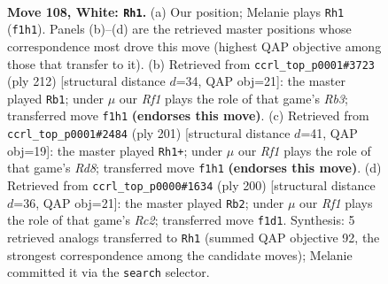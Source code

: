\documentclass[11pt]{article}
\begin{document}
\clearpage

\begin{figure}[p]\centering
\begin{subfigure}{0.46\textwidth}\centering
\resizebox{\linewidth}{!}{%
\newchessgame
\chessboard[
  setfen={8/2k5/p5r1/P1p2p1p/1p3P1P/1P2PKP1/8/5R2 w - - 3 108},
  showmover=false,
  pgfstyle=straightmove, color=movearrow, markmove={f1-h1}
]}
\caption{}
\end{subfigure}\hfill
\begin{subfigure}{0.46\textwidth}\centering
\resizebox{\linewidth}{!}{%
\newchessgame
\chessboard[
  setfen={8/5p2/4p2k/4Pp1p/5P1P/1R4PK/4r3/8 w - - 97 107},
  showmover=false,
  pgfstyle=straightmove, color=movearrow, markmove={b3-b1}
]}
\caption{}
\end{subfigure}
\\[4pt]
\begin{subfigure}{0.46\textwidth}\centering
\resizebox{\linewidth}{!}{%
\newchessgame
\chessboard[
  setfen={8/1R3pk1/4p1p1/6Pp/4P2P/5P1K/8/3r4 b - - 90 101},
  showmover=false,
  pgfstyle=straightmove, color=movearrow, markmove={d1-h1}
]}
\caption{}
\end{subfigure}\hfill
\begin{subfigure}{0.46\textwidth}\centering
\resizebox{\linewidth}{!}{%
\newchessgame
\chessboard[
  setfen={8/2p5/3p2p1/r2Pp1pk/2P1P3/5PKP/2R5/8 w - - 19 101},
  showmover=false,
  pgfstyle=straightmove, color=movearrow, markmove={c2-b2}
]}
\caption{}
\end{subfigure}
\caption{\textbf{Move 108, White: \texttt{Rh1}.} (a) Our position; Melanie plays \texttt{Rh1} (\texttt{f1h1}). Panels (b)--(d) are the retrieved master positions whose correspondence most drove this move (highest QAP objective among those that transfer to it). (b) Retrieved from \texttt{ccrl\_top\_p0001\#3723} (ply 212) [structural distance $d$=34, QAP obj=21]: the master played \texttt{Rb1}; under $\mu$ our \emph{Rf1} plays the role of that game's \emph{Rb3}; transferred move \texttt{f1h1} \textbf{(endorses this move)}. (c) Retrieved from \texttt{ccrl\_top\_p0001\#2484} (ply 201) [structural distance $d$=41, QAP obj=19]: the master played \texttt{Rh1+}; under $\mu$ our \emph{Rf1} plays the role of that game's \emph{Rd8}; transferred move \texttt{f1h1} \textbf{(endorses this move)}. (d) Retrieved from \texttt{ccrl\_top\_p0000\#1634} (ply 200) [structural distance $d$=36, QAP obj=21]: the master played \texttt{Rb2}; under $\mu$ our \emph{Rf1} plays the role of that game's \emph{Rc2}; transferred move \texttt{f1d1}. Synthesis: 5 retrieved analogs transferred to \texttt{Rh1} (summed QAP objective 92, the strongest correspondence among the candidate moves); Melanie committed it via the \texttt{search} selector.}
\label{fig:thought-m214}
\end{figure}
\end{document}
